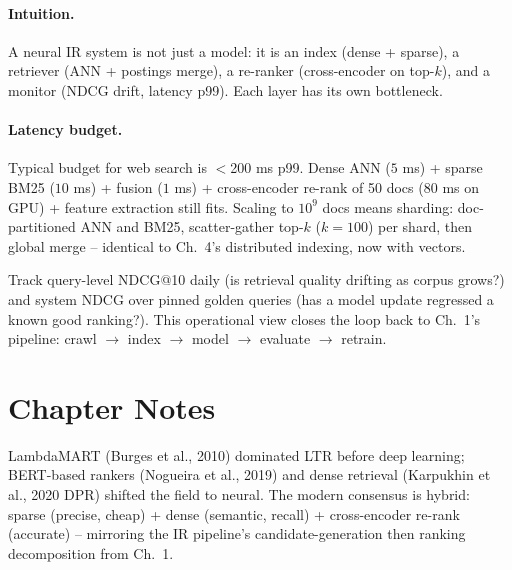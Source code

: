 \paragraph{Intuition.} A neural IR system is not just a model: it is an index (dense + sparse), a retriever (ANN + postings merge), a re-ranker (cross-encoder on top-$k$), and a monitor (NDCG drift, latency p99). Each layer has its own bottleneck.

\paragraph{Latency budget.} Typical budget for web search is $<$200 ms p99. Dense ANN ($5$ ms) + sparse BM25 ($10$ ms) + fusion ($1$ ms) + cross-encoder re-rank of 50 docs ($80$ ms on GPU) + feature extraction still fits. Scaling to $10^9$ docs means sharding: doc-partitioned ANN and BM25, scatter-gather top-$k$ ($k=100$) per shard, then global merge -- identical to Ch.~4's distributed indexing, now with vectors.

\begin{remark}[Monitoring]
Track query-level NDCG@10 daily (is retrieval quality drifting as corpus grows?) and system NDCG over pinned golden queries (has a model update regressed a known good ranking?). This operational view closes the loop back to Ch.~1's pipeline: crawl $\to$ index $\to$ model $\to$ evaluate $\to$ retrain.
\end{remark}

\section{Chapter Notes}
LambdaMART (Burges et al., 2010) dominated LTR before deep learning; BERT-based rankers (Nogueira et al., 2019) and dense retrieval (Karpukhin et al., 2020 DPR) shifted the field to neural. The modern consensus is hybrid: sparse (precise, cheap) + dense (semantic, recall) + cross-encoder re-rank (accurate) -- mirroring the IR pipeline's candidate-generation then ranking decomposition from Ch.~1.

